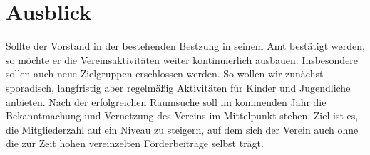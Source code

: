 \documentclass[10pt,DIV16]{scrartcl}
\begin{document}
\section{Ausblick}

Sollte der Vorstand in der bestehenden Bestzung in seinem Amt bestätigt
werden, so möchte er die Vereinsaktivitäten weiter kontinuierlich ausbauen.
Insbesondere sollen auch neue Zielgruppen erschlossen werden.  So wollen wir
zunächst sporadisch, langfristig aber regelmäßig Aktivitäten für Kinder und
Jugendliche anbieten.  Nach der erfolgreichen Raumsuche soll im kommenden Jahr
die Bekanntmachung und Vernetzung des Vereins im Mittelpunkt stehen.  Ziel ist
es, die Mitgliederzahl auf ein Niveau zu steigern, auf dem sich der Verein
auch ohne die zur Zeit hohen vereinzelten Förderbeiträge selbst trägt.
\end{document}
